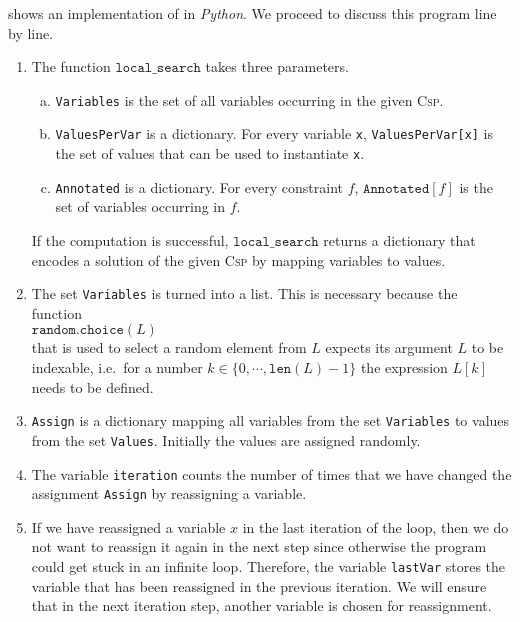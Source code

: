  shows an implementation of  in \textsl{Python}.  We
proceed to discuss this program line by line.
\begin{enumerate}
\item The function $\texttt{local\_search}$ takes three parameters.  
      \begin{enumerate}[(a)]
      \item \texttt{Variables} is the set of all variables occurring in the given \textsc{Csp}.
      \item \texttt{ValuesPerVar} is a dictionary.  For every variable \texttt{x}, \texttt{ValuesPerVar[x]} is
            the set of values that can be used to instantiate \texttt{x}.
      \item \texttt{Annotated} is a dictionary.  For every constraint $f$, $\texttt{Annotated}[f]$ is the set
            of variables occurring in $f$.
      \end{enumerate}
      If the computation is successful, $\texttt{local\_search}$ returns a dictionary that encodes a solution of the
      given \textsc{Csp} by mapping variables to values.
\item The set \texttt{Variables} is turned into a list.  This is necessary because the function
      \\[0.2cm]
      \hspace*{1.3cm}
      $\texttt{random.choice}(L)$
      \\[0.2cm]
      that is used to select a random element from $L$ expects its argument $L$ to be indexable, i.e.~for
      a number $k \in \{0, \cdots, \texttt{len}(L)-1\}$ the expression $L[k]$ needs to be defined.
\item \texttt{Assign} is a dictionary mapping all variables from the set \texttt{Variables} to values from the
      set \texttt{Values}.  Initially the values are assigned randomly.
\item The variable \texttt{iteration} counts the number of times that we have changed the assignment
      \texttt{Assign} by reassigning a variable.
\item If we have reassigned a variable $x$ in the last iteration of the loop, then we do not want to reassign
      it again in the next step since otherwise the program could get stuck in an infinite loop.  Therefore,
      the variable \texttt{lastVar} stores the variable that has been reassigned in the previous iteration.
      We will ensure that in the next iteration step, another variable is chosen for reassignment.

\end{enumerate}
